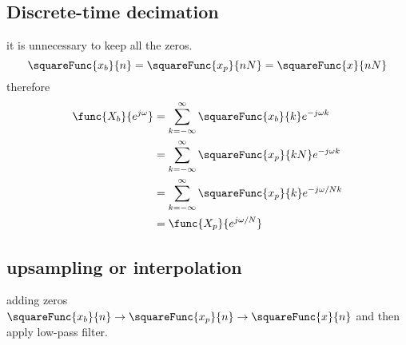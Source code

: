 \subsection*{Discrete-time decimation}
it is unnecessary to keep all the zeros. 
\begin{equation*}
    \squareFunc{x_b}{n} = \squareFunc{x_p}{nN} = \squareFunc{x}{nN}
\end{equation*}
therefore 
\begin{align*}
    \func{X_b}{e^{j\omega}} &= \sum_{k = -\infty}^{\infty} \squareFunc{x_b}{k} e^{-j\omega k}\\
    &= \sum_{k = -\infty}^{\infty} \squareFunc{x_p}{kN} e^{-j\omega k}\\
    &= \sum_{k = -\infty}^{\infty} \squareFunc{x_p}{k} e^{-j\omega/N k}\\
    &= \func{X_p}{e^{j \omega/N}}
\end{align*}
\subsection{upsampling or interpolation}
adding zeros \(\squareFunc{x_b}{n} \to \squareFunc{x_p}{n} \to \squareFunc{x}{n}\) and then apply low-pass filter.
